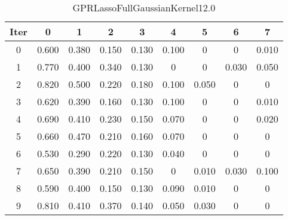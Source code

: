 \begin{table}
	\begin{center}
		\begin{tabular}{|c|c|c|c|c|c|c|c|c|}
			\hline
			Iter & 0 & 1 & 2 & 3 & 4 & 5 & 6 & 7 \\
			\hline
			0 & 0.600 & 0.380 & 0.150 & 0.130 & 0.100 & 0 & 0 & 0.010 \\
			\hline
			1 & 0.770 & 0.400 & 0.340 & 0.130 & 0 & 0 & 0.030 & 0.050 \\
			\hline
			2 & 0.820 & 0.500 & 0.220 & 0.180 & 0.100 & 0.050 & 0 & 0 \\
			\hline
			3 & 0.620 & 0.390 & 0.160 & 0.130 & 0.100 & 0 & 0 & 0.010 \\
			\hline
			4 & 0.690 & 0.410 & 0.230 & 0.150 & 0.070 & 0 & 0 & 0.020 \\
			\hline
			5 & 0.660 & 0.470 & 0.210 & 0.160 & 0.070 & 0 & 0 & 0 \\
			\hline
			6 & 0.530 & 0.290 & 0.220 & 0.130 & 0.040 & 0 & 0 & 0 \\
			\hline
			7 & 0.650 & 0.390 & 0.210 & 0.150 & 0 & 0.010 & 0.030 & 0.100 \\
			\hline
			8 & 0.590 & 0.400 & 0.150 & 0.130 & 0.090 & 0.010 & 0 & 0 \\
			\hline
			9 & 0.810 & 0.410 & 0.370 & 0.140 & 0.050 & 0.030 & 0 & 0 \\
			\hline
		\end{tabular}
	\end{center}
	\caption{GPRLassoFullGaussianKernel12.0}
\end{table}